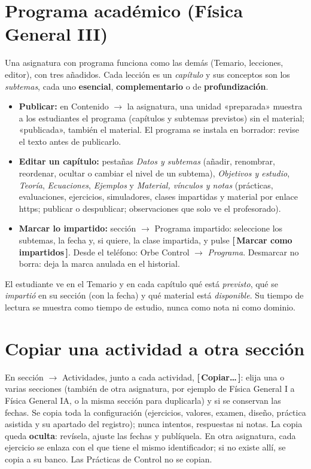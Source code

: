 \documentclass[11pt,a4paper,oneside]{book}
\newcommand{\boton}[1]{\textsf{\textbf{[\,#1\,]}}}
\newcommand{\ruta}[1]{\textsf{#1}}
\begin{document}
\section{Programa académico (Física General III)}
Una asignatura con programa funciona como las demás (Temario, lecciones, editor), con tres añadidos. Cada lección es un
\emph{capítulo} y sus conceptos son los \emph{subtemas}, cada uno \textbf{esencial}, \textbf{complementario} o de
\textbf{profundización}.
\begin{itemize}
  \item \textbf{Publicar:} en \ruta{Contenido $\rightarrow$ la asignatura}, una unidad «preparada» muestra a los estudiantes el programa
        (capítulos y subtemas previstos) sin el material; «publicada», también el material. El programa se instala en borrador:
        revise el texto antes de publicarlo.
  \item \textbf{Editar un capítulo:} pestañas \emph{Datos y subtemas} (añadir, renombrar, reordenar, ocultar o cambiar el nivel de un
        subtema), \emph{Objetivos y estudio}, \emph{Teoría}, \emph{Ecuaciones}, \emph{Ejemplos} y \emph{Material, vínculos y notas}
        (prácticas, evaluaciones, ejercicios, simuladores, clases impartidas y material por enlace https; publicar o despublicar;
        observaciones que solo ve el profesorado).
  \item \textbf{Marcar lo impartido:} \ruta{sección $\rightarrow$ Programa impartido}: seleccione los subtemas, la fecha y, si quiere, la
        clase impartida, y pulse \boton{Marcar como impartidos}. Desde el teléfono: Orbe Control $\rightarrow$ \emph{Programa}. Desmarcar
        no borra: deja la marca anulada en el historial.
\end{itemize}
El estudiante ve en el Temario y en cada capítulo qué está \emph{previsto}, qué se \emph{impartió} en su sección (con la fecha) y
qué material está \emph{disponible}. Su tiempo de lectura se muestra como tiempo de estudio, nunca como nota ni como dominio.

\section{Copiar una actividad a otra sección}
En \ruta{sección $\rightarrow$ Actividades}, junto a cada actividad, \boton{Copiar\ldots}: elija una o varias secciones (también de otra
asignatura, por ejemplo de Física General I a Física General IA, o la misma sección para duplicarla) y si se conservan las fechas.
Se copia toda la configuración (ejercicios, valores, examen, diseño, práctica asistida y su apartado del registro); nunca intentos,
respuestas ni notas. La copia queda \textbf{oculta}: revísela, ajuste las fechas y publíquela. En otra asignatura, cada ejercicio
se enlaza con el que tiene el mismo identificador; si no existe allí, se copia a su banco. Las Prácticas de Control no se copian.
\end{document}
